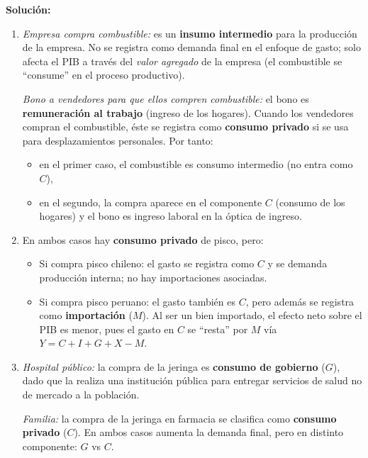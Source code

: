 \documentclass[11pt,addpoints]{article}
\begin{document}
\textbf{Solución:}\\
\begin{enumerate}[label=\alph*)]
\item 
\textit{Empresa compra combustible:} es un \textbf{insumo intermedio} para la producción de la empresa. No se registra como demanda final en el enfoque de gasto; solo afecta el PIB a través del \emph{valor agregado} de la empresa (el combustible se “consume” en el proceso productivo).\medskip

\textit{Bono a vendedores para que ellos compren combustible:} el bono es \textbf{remuneración al trabajo} (ingreso de los hogares). Cuando los vendedores compran el combustible, éste se registra como \textbf{consumo privado} si se usa para desplazamientos personales. Por tanto:
\begin{itemize}
  \item en el primer caso, el combustible es consumo intermedio (no entra como $C$),
  \item en el segundo, la compra aparece en el componente $C$ (consumo de los hogares) y el bono es ingreso laboral en la óptica de ingreso.
\end{itemize}

\item 
En ambos casos hay \textbf{consumo privado} de pisco, pero:
\begin{itemize}
  \item Si compra pisco chileno: el gasto se registra como $C$ y se demanda producción interna; no hay importaciones asociadas.
  \item Si compra pisco peruano: el gasto también es $C$, pero además se registra como \textbf{importación} ($M$). Al ser un bien importado, el efecto neto sobre el PIB es menor, pues el gasto en $C$ se “resta” por $M$ vía $Y = C + I + G + X - M$.
\end{itemize}

\item 
\textit{Hospital público:} la compra de la jeringa es \textbf{consumo de gobierno} ($G$), dado que la realiza una institución pública para entregar servicios de salud no de mercado a la población.\medskip

\textit{Familia:} la compra de la jeringa en farmacia se clasifica como \textbf{consumo privado} ($C$). En ambos casos aumenta la demanda final, pero en distinto componente: $G$ vs $C$.
\end{enumerate}

\newpage
\vspace*{0.5cm}
\end{document}

